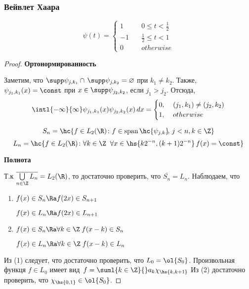 \documentclass[a4paper]{article}
\DeclareMathOperator{\spn}{span}
\begin{document}
\subsubsection{Вейвлет Хаара}
  \begin{displaymath}
    \psi(t) = 
      \begin{cases}
        1 \quad&  0\le t<\frac12 \\ -1 \quad & \frac12\le t<1 \\ 0\quad & otherwise
      \end{cases}
  \end{displaymath}
  \begin{proof}
    {\bfseries Ортонормированность}\par
    Заметим, что $\supp\psi_{j,k_1}\cap\,\supp\psi_{j,k_2} = \varnothing$ при $k_1\neq k_2$. Также,
    $\psi_{j_1,k_1}(x) = \const$ при $x\in\supp\psi_{j_2,k_2}$, если $j_1>j_2$.
    Отсюда,
    \begin{displaymath}
      \intl{-\infty}{\infty}\psi_{j_1,k_1}(x)\psi_{j_2,k_2}(x)\,dx = 
      \begin{cases}
        0,&\; (j_1,k_1)\neq(j_2,k_2)\\
        1,&\; otherwise
      \end{cases}
    \end{displaymath}
    \begin{df}
      \begin{equation*}
        S_n = \hc{f\in L_2(\R)\colon f\in\spn\hc{\psi_{j,k}}\!,\, j<n, k\in\Z}
      \end{equation*}
      \begin{equation*}
        L_n= \hc{f\in L_2(\R)\colon \forall k \in\Z\;\;\forall x\in\hs{k2^{-n}, (k+1)2^{-n}}\, f(x)=\const }
      \end{equation*}
    \end{df}
        {\bfseries Полнота}\par
        Т.к $\overline{\bigcup\limits_{n\in\Z}L_n} = L_2(\R)$, то достаточно проверить, что $\overline{S_n} = L_n$.
        Наблюдаем, что 
        \begin{enumerate}
        \item \par $f(x) \in S_n  \Ra f(2x)\in S_{n+1}$
          \par $f(x) \in L_n  \Ra f(2x)\in L_{n+1}$
          \item \par $f(x) \in S_n \Ra \forall k\in\Z\; f(x-k)\in S_n$
            \par $f(x) \in L_n \Ra \forall k\in\Z\; f(x-k)\in L_n$
        \end{enumerate}
        Из (1) следует, что достаточно проверить, что $L_0=\ol{S_0}$.
        Произвольная функця $f\in L_0$ имеет вид~\mbox{$f=\suml{k\in\Z}{} a_k\chi_{\hs{k,k+1}}$}
        Из (2) достаточно проверить, что $\chi_{\hs{0,1}}\in\ol{S_0}$.
  \end{proof}
\end{document}
